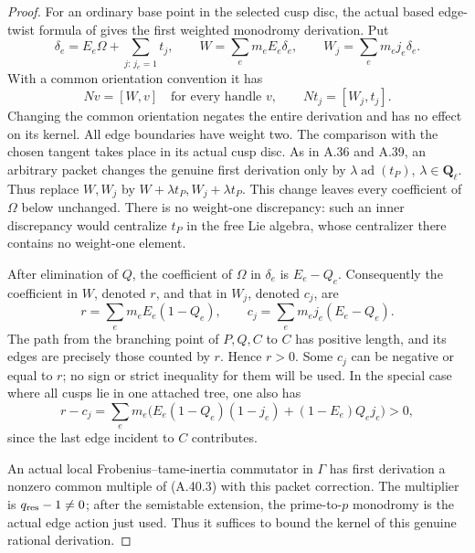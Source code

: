 \begin{proof}
For an ordinary base point in the selected cusp disc,
the actual based edge-twist formula of
\cite[Definition 3.1.5 and Theorem 3.1.6]{fghBettsDogra}
gives the first weighted monodromy derivation. Put
\[
 \delta_e=E_e\Omega+\sum_{j:\,j_e=1}t_j,
 \qquad
 W=\sum_e m_eE_e\delta_e,
 \qquad W_j=\sum_e m_ej_e\delta_e.                    \tag{A.40.2}
\]
With a common orientation convention it has
\[
         Nv=[W,v]\quad\text{for every handle }v,
             \qquad Nt_j=[W_j,t_j].                 \tag{A.40.3}
\]
Changing the common orientation negates the entire
derivation and has no effect on its kernel. All
edge boundaries have weight two. The comparison with
the chosen tangent takes place in its actual cusp
disc. As in A.36 and A.39, an arbitrary packet changes
the genuine first derivation only by
\(\lambda\operatorname{ad}(t_P)\),
\(\lambda\in\mathbf Q_\ell\). Thus replace
\(W,W_j\) by \(W+\lambda t_P,W_j+\lambda t_P\).
This change leaves every coefficient of \(\Omega\)
below unchanged. There is no weight-one discrepancy:
such an inner discrepancy would centralize \(t_P\)
in the free Lie algebra, whose centralizer there
contains no weight-one element.

After elimination of \(Q\), the coefficient of
\(\Omega\) in \(\delta_e\) is \(E_e-Q_e\).
Consequently the coefficient in \(W\), denoted \(r\),
and that in \(W_j\), denoted \(c_j\), are
\[
 r=\sum_e m_eE_e(1-Q_e),\qquad
 c_j=\sum_e m_ej_e(E_e-Q_e).                         \tag{A.40.4}
\]
The path from the branching point of \(P,Q,C\) to
\(C\) has positive length, and its edges are precisely
those counted by \(r\). Hence \(r>0\). Some \(c_j\)
can be negative or equal to \(r\); no sign or strict
inequality for them will be used. In the special case
where all cusps lie in one attached tree, one also has
\[
 r-c_j=\sum_e m_e\bigl(E_e(1-Q_e)(1-j_e)
                   +(1-E_e)Q_ej_e\bigr)>0,          \tag{A.40.5}
\]
since the last edge incident to \(C\) contributes.

An actual local Frobenius--tame-inertia commutator in
\(\Gamma\) has first derivation a nonzero common
multiple of (A.40.3) with this packet correction.
The multiplier is \(q_{\rm res}-1\ne0\); after the
semistable extension, the prime-to-\(p\) monodromy is
the actual edge action just used. Thus it suffices to
bound the kernel of this genuine rational derivation.


\end{proof}
